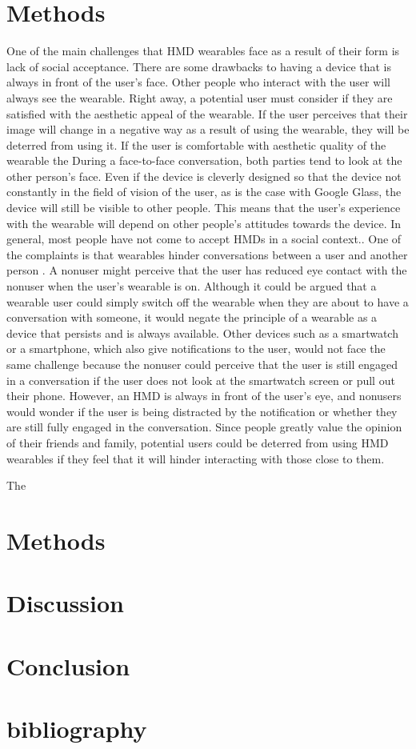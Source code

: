 \documentclass[11pt]{article}
\newcommand{\myreferences}{references}
\begin{document}
\section{Methods}

One of the main challenges that HMD wearables face as a result of their form is lack of social acceptance. There are some drawbacks to having a device that is always in front of the user's face. Other people who interact with the user will always see the wearable. Right away, a potential user must consider if they are satisfied with the aesthetic appeal of the wearable. If the user perceives that their image will change in a negative way as a result of using the wearable, they will be deterred from using it\cite{WearableHumanView}. If the user is comfortable with aesthetic quality of the wearable the  During a face-to-face conversation, both parties tend to look at the other person's face. Even if the device is cleverly designed so that the device not constantly in the field of vision of the user, as is the case with Google Glass, the device will still be visible to other people. This means that the user's experience with the wearable will depend on other people's attitudes towards the device. In general, most people have not come to accept HMDs in a social context.\cite{negativeGlassReactions}. One of the complaints is that wearables hinder conversations between a user and another person \cite{wearableFaceToFace}. A nonuser might perceive that the user has reduced eye contact with the nonuser when the user's wearable is on. Although it could be argued that a wearable user could simply switch off the wearable when they are about to have a conversation with someone, it would negate the principle of a wearable as a device that persists and is always available. Other devices such as a smartwatch or a smartphone, which also give notifications to the user, would not face the same challenge because the nonuser could perceive that the user is still engaged in a conversation if the user does not look at the smartwatch screen or pull out their phone. However, an HMD is always in front of the user's eye, and nonusers would wonder if the user is being distracted by the notification or whether they are still fully engaged in the conversation. Since people greatly value the opinion of their friends and family, potential users could be deterred from using HMD wearables if they feel that it will hinder interacting with those close to them\cite{WearableHumanView}. 

The  

\section{Methods}
\section{Discussion}
\section{Conclusion}
\section{bibliography}


\end{document}
